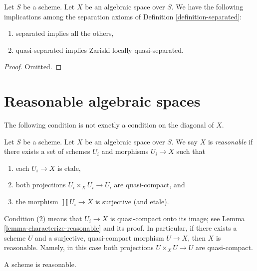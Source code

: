 \begin{lemma}
\label{lemma-trivial-implications}
Let $S$ be a scheme.
Let $X$ be an algebraic space over $S$.
We have the following implications among the separation axioms
of Definition \ref{definition-separated}:
\begin{enumerate}
\item separated implies all the others,
\item quasi-separated implies Zariski locally quasi-separated.
\end{enumerate}
\end{lemma}

\begin{proof}
Omitted.
\end{proof}







\section{Reasonable algebraic spaces}
\label{section-reasonable}

\noindent
The following condition is not exactly a condition on the diagonal of $X$.

\begin{definition}
\label{definition-reasonable}
Let $S$ be a scheme.
Let $X$ be an algebraic space over $S$.
We say $X$ is {\it reasonable} if there exists a set of schemes
$U_i$ and morphisms $U_i \to X$ such that
\begin{enumerate}
\item each $U_i \to X$ is etale,
\item both projections $U_i \times_X U_i \to U_i$ are
quasi-compact, and
\item the morphism $\coprod U_i \to X$ is surjective (and etale).
\end{enumerate}
\end{definition}

\noindent
Condition (2) means that $U_i \to X$ is quasi-compact onto its image;
see Lemma \ref{lemma-characterize-reasonable} and its proof.
In particular, if there exists a scheme $U$ and a surjective, quasi-compact
morphism $U \to X$, then $X$ is reasonable. Namely, in this case both
projections $U \times_X U \to U$ are quasi-compact.

\begin{lemma}
\label{lemma-scheme-reasonable}
A scheme is reasonable.
\end{lemma}

